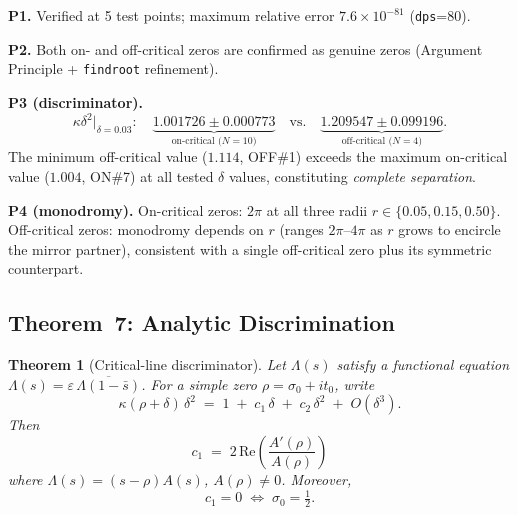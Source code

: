 \documentclass[11pt, a4paper]{article}
\theoremstyle{plain}
\newtheorem{theorem}{Theorem}
\theoremstyle{definition}
\begin{document}
\medskip
\noindent\textbf{P1.} Verified at 5 test points; maximum relative error
$7.6\times10^{-81}$ (\texttt{dps}=80).

\medskip
\noindent\textbf{P2.} Both on- and off-critical zeros are confirmed as
genuine zeros (Argument Principle + \texttt{findroot} refinement).

\medskip
\noindent\textbf{P3 (discriminator).}
\begin{equation}
  \label{eq:p3disc}
  \kappa\delta^{2}\big|_{\delta=0.03}:
  \quad
  \underbrace{1.001726\pm 0.000773}_{\text{on-critical (}N=10\text{)}}
  \quad\text{vs.}\quad
  \underbrace{1.209547\pm 0.099196}_{\text{off-critical (}N=4\text{)}}.
\end{equation}
The minimum off-critical value ($1.114$, OFF\#1) exceeds the maximum
on-critical value ($1.004$, ON\#7) at all tested $\delta$ values,
constituting \emph{complete separation}.

\medskip
\noindent\textbf{P4 (monodromy).}  On-critical zeros: $2\pi$ at all
three radii $r\in\{0.05, 0.15, 0.50\}$.  Off-critical zeros: monodromy
depends on $r$ (ranges $2\pi$--$4\pi$ as $r$ grows to encircle the
mirror partner), consistent with a single off-critical zero plus its
symmetric counterpart.


\subsection{Theorem~7: Analytic Discrimination}
\label{ssec:thm7}

\begin{theorem}[Critical-line discriminator]
\label{thm:disc}
  Let $\Lambda(s)$ satisfy a functional equation
  $\Lambda(s)=\varepsilon\,\overline{\Lambda(1-\bar{s})}$.  For a
  simple zero $\rho=\sigma_{0}+it_{0}$, write
  \[
    \kappa(\rho+\delta)\,\delta^{2}
    \;=\; 1 \;+\; c_{1}\,\delta \;+\; c_{2}\,\delta^{2} \;+\; O(\delta^{3}).
  \]
  Then
  \[
    c_{1} \;=\; 2\,\mathrm{Re}\!\left(\frac{A'(\rho)}{A(\rho)}\right)
  \]
  where $\Lambda(s)=(s-\rho)A(s)$, $A(\rho)\neq 0$.
  Moreover,
  \[
    \boxed{c_{1} = 0 \;\iff\; \sigma_{0} = \tfrac{1}{2}.}
  \]
\end{theorem}
\end{document}
